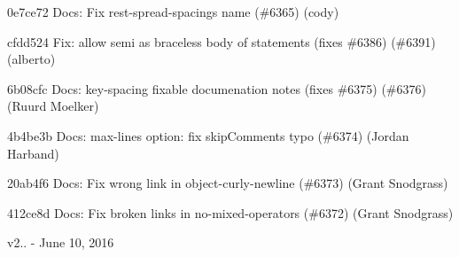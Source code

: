 \begin{DoxyItemize}
\item 0e7ce72 Docs\+: Fix rest-\/spread-\/spacing\textquotesingle{}s name (\#6365) (cody)
\item cfdd524 Fix\+: allow semi as braceless body of statements (fixes \#6386) (\#6391) (alberto)
\item 6b08cfc Docs\+: key-\/spacing fixable documenation notes (fixes \#6375) (\#6376) (Ruurd Moelker)
\item 4b4be3b Docs\+: {\ttfamily max-\/lines} option\+: fix {\ttfamily skip\+Comments} typo (\#6374) (Jordan Harband)
\item 20ab4f6 Docs\+: Fix wrong link in object-\/curly-\/newline (\#6373) (Grant Snodgrass)
\item 412ce8d Docs\+: Fix broken links in no-\/mixed-\/operators (\#6372) (Grant Snodgrass)
\end{DoxyItemize}

v2.. -\/ June 10, 2016


